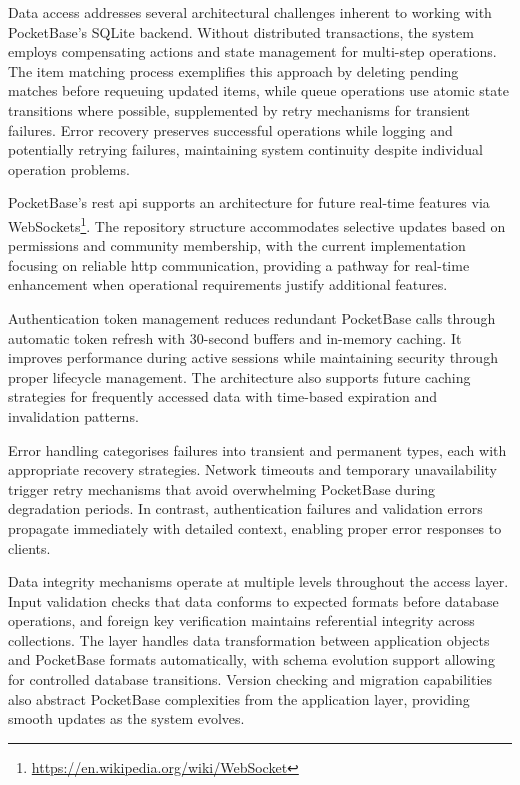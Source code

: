 Data access addresses several architectural challenges inherent to working with PocketBase's SQLite backend. Without distributed transactions, the system employs compensating actions and state management for multi-step operations. The item matching process exemplifies this approach by deleting pending matches before requeuing updated items, while queue operations use atomic state transitions where possible, supplemented by retry mechanisms for transient failures. Error recovery preserves successful operations while logging and potentially retrying failures, maintaining system continuity despite individual operation problems.

PocketBase's \ac{rest} \ac{api} supports an architecture for future real-time features via WebSockets\footnote{\url{https://en.wikipedia.org/wiki/WebSocket}}. The repository structure accommodates selective updates based on permissions and community membership, with the current implementation focusing on reliable \ac{http} communication, providing a pathway for real-time enhancement when operational requirements justify additional features.

Authentication token management reduces redundant PocketBase calls through automatic token refresh with 30-second buffers and in-memory caching. It improves performance during active sessions while maintaining security through proper lifecycle management. The architecture also supports future caching strategies for frequently accessed data with time-based expiration and invalidation patterns.

Error handling categorises failures into transient and permanent types, each with appropriate recovery strategies. Network timeouts and temporary unavailability trigger retry mechanisms that avoid overwhelming PocketBase during degradation periods. In contrast, authentication failures and validation errors propagate immediately with detailed context, enabling proper error responses to clients.

Data integrity mechanisms operate at multiple levels throughout the access layer. Input validation checks that data conforms to expected formats before database operations, and foreign key verification maintains referential integrity across collections. The layer handles data transformation between application objects and PocketBase formats automatically, with schema evolution support allowing for controlled database transitions. Version checking and migration capabilities also abstract PocketBase complexities from the application layer, providing smooth updates as the system evolves.


